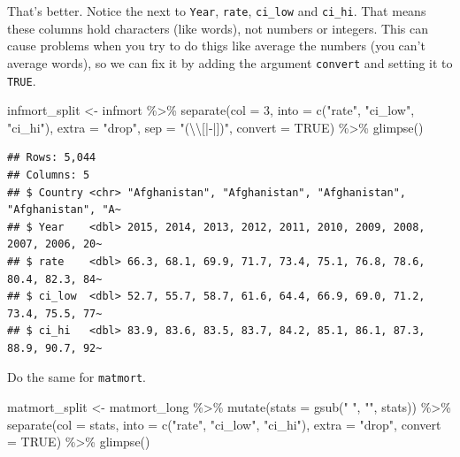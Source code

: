 \documentclass[
  oneside]{book}
\newenvironment{Shaded}{\begin{snugshade}}{\end{snugshade}}
\newcommand{\AttributeTok}[1]{\textcolor[rgb]{0.77,0.63,0.00}{#1}}
\newcommand{\ConstantTok}[1]{\textcolor[rgb]{0.00,0.00,0.00}{#1}}
\newcommand{\DecValTok}[1]{\textcolor[rgb]{0.00,0.00,0.81}{#1}}
\newcommand{\FunctionTok}[1]{\textcolor[rgb]{0.00,0.00,0.00}{#1}}
\newcommand{\NormalTok}[1]{#1}
\newcommand{\OtherTok}[1]{\textcolor[rgb]{0.56,0.35,0.01}{#1}}
\newcommand{\SpecialCharTok}[1]{\textcolor[rgb]{0.00,0.00,0.00}{#1}}
\newcommand{\StringTok}[1]{\textcolor[rgb]{0.31,0.60,0.02}{#1}}
\begin{document}
That's better. Notice the \emph{} next to \texttt{Year}, \texttt{rate}, \texttt{ci\_low} and \texttt{ci\_hi}. That means these columns hold characters (like words), not numbers or integers. This can cause problems when you try to do thigs like average the numbers (you can't average words), so we can fix it by adding the argument \texttt{convert} and setting it to \texttt{TRUE}.

\begin{Shaded}
\begin{Highlighting}[]
\NormalTok{infmort\_split }\OtherTok{\textless{}{-}}\NormalTok{ infmort }\SpecialCharTok{\%\textgreater{}\%}
  \FunctionTok{separate}\NormalTok{(}\AttributeTok{col =} \DecValTok{3}\NormalTok{, }
           \AttributeTok{into =} \FunctionTok{c}\NormalTok{(}\StringTok{"rate"}\NormalTok{, }\StringTok{"ci\_low"}\NormalTok{, }\StringTok{"ci\_hi"}\NormalTok{), }
           \AttributeTok{extra =} \StringTok{"drop"}\NormalTok{, }
           \AttributeTok{sep =} \StringTok{"(}\SpecialCharTok{\textbackslash{}\textbackslash{}}\StringTok{[|{-}|])"}\NormalTok{, }
           \AttributeTok{convert =} \ConstantTok{TRUE}\NormalTok{) }\SpecialCharTok{\%\textgreater{}\%}
  \FunctionTok{glimpse}\NormalTok{()}
\end{Highlighting}
\end{Shaded}

\begin{verbatim}
## Rows: 5,044
## Columns: 5
## $ Country <chr> "Afghanistan", "Afghanistan", "Afghanistan", "Afghanistan", "A~
## $ Year    <dbl> 2015, 2014, 2013, 2012, 2011, 2010, 2009, 2008, 2007, 2006, 20~
## $ rate    <dbl> 66.3, 68.1, 69.9, 71.7, 73.4, 75.1, 76.8, 78.6, 80.4, 82.3, 84~
## $ ci_low  <dbl> 52.7, 55.7, 58.7, 61.6, 64.4, 66.9, 69.0, 71.2, 73.4, 75.5, 77~
## $ ci_hi   <dbl> 83.9, 83.6, 83.5, 83.7, 84.2, 85.1, 86.1, 87.3, 88.9, 90.7, 92~
\end{verbatim}

Do the same for \texttt{matmort}.

\begin{Shaded}
\begin{Highlighting}[]
\NormalTok{matmort\_split }\OtherTok{\textless{}{-}}\NormalTok{ matmort\_long }\SpecialCharTok{\%\textgreater{}\%}
  \FunctionTok{mutate}\NormalTok{(}\AttributeTok{stats =} \FunctionTok{gsub}\NormalTok{(}\StringTok{" "}\NormalTok{, }\StringTok{""}\NormalTok{, stats)) }\SpecialCharTok{\%\textgreater{}\%}
  \FunctionTok{separate}\NormalTok{(}\AttributeTok{col =}\NormalTok{ stats, }
           \AttributeTok{into =} \FunctionTok{c}\NormalTok{(}\StringTok{"rate"}\NormalTok{, }\StringTok{"ci\_low"}\NormalTok{, }\StringTok{"ci\_hi"}\NormalTok{), }
           \AttributeTok{extra =} \StringTok{"drop"}\NormalTok{, }
           \AttributeTok{convert =} \ConstantTok{TRUE}\NormalTok{) }\SpecialCharTok{\%\textgreater{}\%}
  \FunctionTok{glimpse}\NormalTok{()}
\end{Highlighting}
\end{Shaded}
\end{document}
